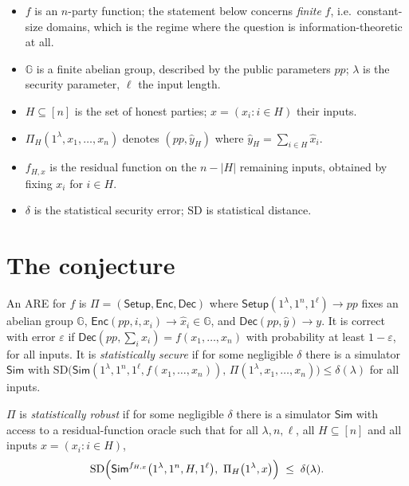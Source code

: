 \documentclass{conjura-conjecture}
\newcommand{\eps}{\varepsilon}
\newcommand{\Gr}{\mathbb{G}}
\newcommand{\Enc}{\mathsf{Enc}}
\newcommand{\Dec}{\mathsf{Dec}}
\newcommand{\Setup}{\mathsf{Setup}}
\newcommand{\Sim}{\mathsf{Sim}}
\newcommand{\SD}{\mathrm{SD}}
\begin{document}
\begin{itemize}[nosep]
  \item $f$ is an $n$-party function; the statement below concerns
    \emph{finite} $f$, i.e.\ constant-size domains, which is the regime
    where the question is information-theoretic at all.
  \item $\Gr$ is a finite abelian group, described by the public
    parameters $pp$; $\lambda$ is the security parameter, $\ell$ the
    input length.
  \item $H \subseteq [n]$ is the set of honest parties; $x = (x_{i} : i
    \in H)$ their inputs.
  \item $\Pi_{H}(1^{\lambda}, x_{1}, \dots, x_{n})$ denotes $(pp,
    \widehat{y}_{H})$ where $\widehat{y}_{H} = \sum_{i \in
    H}\widehat{x}_{i}$.
  \item $f_{H,x}$ is the residual function on the $n - |H|$ remaining
    inputs, obtained by fixing $x_{i}$ for $i \in H$.
  \item $\delta$ is the statistical security error; $\SD$ is statistical
    distance.
\end{itemize}

\section{The conjecture}\label{sec:conjectures}

\begin{definition}
  \label{def:are}
An ARE for $f$ is $\Pi = (\Setup, \Enc, \Dec)$ where $\Setup(1^{\lambda},
1^{n}, 1^{\ell}) \to pp$ fixes an abelian group $\Gr$, $\Enc(pp, i,
x_{i}) \to \widehat{x}_{i} \in \Gr$, and $\Dec(pp, \widehat{y}) \to y$.
It is correct with error $\eps$ if $\Dec(pp, \sum_{i}\widehat{x}_{i}) =
f(x_{1},\dots,x_{n})$ with probability at least $1 - \eps$, for all
inputs. It is \emph{statistically secure} if for some negligible $\delta$
there is a simulator $\Sim$ with
$\SD\bigl(\Sim(1^{\lambda},1^{n},1^{\ell},f(x_{1},\dots,x_{n})),\,
\Pi(1^{\lambda},x_{1},\dots,x_{n})\bigr) \le \delta(\lambda)$ for all
inputs.
\end{definition}

\begin{definition}
  \label{def:robust}
$\Pi$ is \emph{statistically robust} if for some negligible $\delta$
there is a simulator $\Sim$ with access to a residual-function oracle
such that for all $\lambda, n, \ell$, all $H \subseteq [n]$ and all
inputs $x = (x_{i} : i \in H)$,
\[
  \SD\Bigl( \Sim^{f_{H,x}}\bigl(1^{\lambda}, 1^{n}, H, 1^{\ell}\bigr),\
  \Pi_{H}\bigl(1^{\lambda}, x\bigr) \Bigr) \;\le\; \delta(\lambda).
\]
\end{definition}
\end{document}

